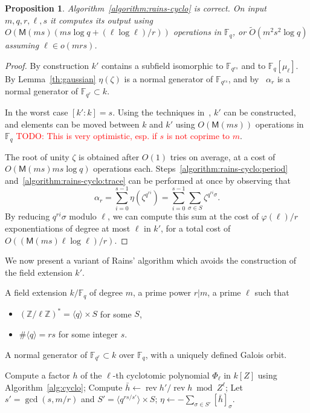 \documentclass[12pt]{article}
\theoremstyle{plain}
\newtheorem{proposition}[theorem]{Proposition}
\theoremstyle{definition}
\newcommand{\tildO}{\tilde{O}}
\newcommand{\todo}[1]{\textcolor{red}{TODO: #1}}
\DeclareMathOperator{\rev}{rev}
\def\Z{\ensuremath{\mathbb{Z}}}
\def\F{\ensuremath{\mathbb{F}}}
\def\MM{\ensuremath{\mathsf{M}}}
\def\euler{\ensuremath{\varphi}}
\newcounter{algorithm}
\begin{document}
\begin{proposition}
  Algorithm~\ref{algorithm:rains-cyclo} is correct. On input
  $m,q,r,\ell,s$ it computes its output using $O(\MM(ms)(ms\log q +
  (\ell\log\ell)/r))$ operations in $\F_q$, or $\tildO(m^2s^2\log q)$
  assuming $\ell\in o(mrs)$.
\end{proposition}
\begin{proof}
  By construction $k'$ contains a subfield isomorphic to $\F_{q^{rs}}$
  and to $\F_q[\mu_\ell]$. By Lemma~\ref{th:gaussian} $\eta(\zeta)$ is
  a normal generator of $\F_{q^{rs}}$, and
  by~\cite[Prop.~5.2.3.1]{mullen2013handbook} $\alpha_r$ is a normal generator of
  $\F_{q^r}\subset k$.

  In the worst case $[k':k]=s$. Using the techniques
  in~\cite{couveignes+lercier11,DeDoSc13,DeFeo:2014:FAA:2608628.2608672},
  $k'$ can be constructed, and elements can be moved between $k$ and
  $k'$ using $O(\MM(ms))$ operations in $\F_q$ \todo{This is very
    optimistic, esp. if $s$ is not coprime to $m$}.

  The root of unity $\zeta$ is obtained after $O(1)$ tries on average,
  at a cost of $O(\MM(ms)ms\log q)$ operations each.
  Steps~\ref{algorithm:rains-cyclo:period}
  and~\ref{algorithm:rains-cyclo:trace} can be performed at once by
  observing that
  \[\alpha_r = \sum_{i=0}^{s-1}\eta(\zeta^{q^{ri}})= \sum_{i=0}^{s-1}\sum_{\sigma\in S}\zeta^{q^{ri}\sigma}.\]
  By reducing $q^{ri}\sigma$ modulo $\ell$, we can compute this sum at
  the cost of $\euler(\ell)/r$ exponentiations of degree at most
  $\ell$ in $k'$, for a total cost of $O((\MM(ms)\ell\log\ell)/r)$.
\end{proof}

We now present a variant of Rains' algorithm which avoids the
construction of the field extension $k'$. 

\begin{algorithm}
  \label{algorithm:rains-cyclo-2}
  \begin{algorithmic}[1]
    \REQUIRE A field extension $k/\F_q$ of degree $m$, a prime power
    $r|m$, a prime $\ell$ such that
    \begin{itemize}
    \item $(\Z/\ell\Z)^\ast = \langle q\rangle \times S$ for some $S$,
    \item $\#\langle q\rangle = rs$ for some integer $s$.
    \end{itemize}
    \ENSURE A normal generator of $\F_{q^r}\subset k$ over $\F_q$,
    with a uniquely defined Galois orbit.
    
    \STATE Compute a factor $h$ of the $\ell$-th cyclotomic polynomial $\Phi_\ell$ in $k[Z]$ using Algorithm~\ref{alg:cyclo}; 
    \STATE Compute $\bar{h} \leftarrow \rev{h'}/\rev{h} \bmod Z^\ell$;
    \STATE Let $s'=\gcd(s,m/r)$ and $S' = \langle q^{rs/s'}\rangle \times S$;
    \RETURN\label{algorithm:rains-cyclo:period} $\eta \leftarrow -\sum_{\sigma\in S'}[\bar{h}]_\sigma$.
  \end{algorithmic}
\end{algorithm}
\end{document}
